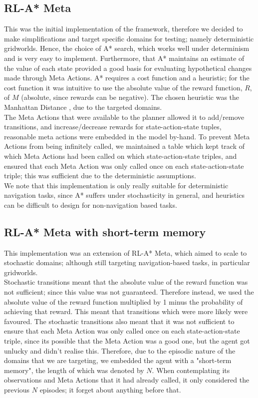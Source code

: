\subsection{RL-A* Meta}
This was the initial implementation of the framework, therefore we decided to make simplifications and target specific domains for testing; namely deterministic gridworlds. Hence, the choice of A* search, which works well under determinism and is very easy to implement. Furthermore, that A* maintains an estimate of the value of each state provided a good basis for evaluating hypothetical changes made through Meta Actions. A* requires a cost function and a heuristic; for the cost function it was intuitive to use the absolute value of the reward function, $R$, of $M$ (absolute, since rewards can be negative). The chosen heuristic was the Manhattan Distance \citep{krause1973taxicab}, due to the targeted domains.
\\The Meta Actions that were available to the planner allowed it to add/remove transitions, and increase/decrease rewards for state-action-state tuples, reasonable meta actions were embedded in the model by-hand. To prevent Meta Actions from being infinitely called, we maintained a table which kept track of which Meta Actions had been called on which state-action-state triples, and ensured that each Meta Action was only called once on each state-action-state triple; this was sufficient due to the deterministic assumptions.
\\We note that this implementation is only really suitable for deterministic navigation tasks, since A* suffers under stochasticity in general, and heuristics can be difficult to design for non-navigation based tasks.

\subsection{RL-A* Meta with short-term memory}
This implementation was an extension of RL-A* Meta, which aimed to scale to stochastic domains; although still targeting navigation-based tasks, in particular gridworlds.
\\Stochastic transitions meant that the absolute value of the reward function was not sufficient; since this value was not guaranteed. Therefore instead, we used the absolute value of the reward function multiplied by 1 minus the probability of achieving that reward. This meant that transitions which were more likely were favoured. The stochastic transitions also meant that it was not sufficient to ensure that each Meta Action was only called once on each state-action-state triple, since its possible that the Meta Action was a good one, but the agent got unlucky and didn't realise this. Therefore, due to the episodic nature of the domains that we are targeting, we embedded the agent with a "short-term memory", the length of which was denoted by $N$. When contemplating its observations and Meta Actions that it had already called, it only considered the previous $N$ episodes; it forget about anything before that.

